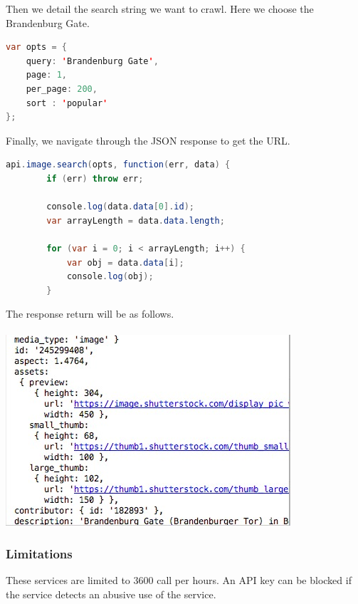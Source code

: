 Then we detail the search string we want to crawl. Here we choose the Brandenburg Gate.

\begin{lstlisting}[language=Java, basicstyle=\scriptsize]
var opts = {
    query: 'Brandenburg Gate',
    page: 1,
    per_page: 200,
    sort : 'popular'
};
\end{lstlisting}

Finally, we navigate through the JSON response to get the URL.

\begin{lstlisting}[language=Java, basicstyle=\scriptsize]
    api.image.search(opts, function(err, data) {
        if (err) throw err;

        console.log(data.data[0].id);
        var arrayLength = data.data.length;

        for (var i = 0; i < arrayLength; i++) {
            var obj = data.data[i];
            console.log(obj);
        }
\end{lstlisting}
The response return will be as follows.\\
\\
\includegraphics{jsonShutter}

\subsubsection{Limitations}
These services are limited to 3600 call per hours. An API key can be blocked if the service detects an abusive use of the service.
